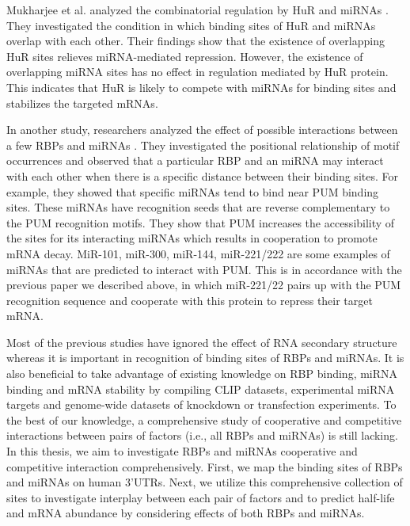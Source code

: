Mukharjee et al. analyzed the combinatorial regulation by HuR and miRNAs \cite{mukharjee_11}. They investigated the condition in which binding sites of HuR and miRNAs overlap with each other. Their findings show that the existence of overlapping HuR sites relieves miRNA-mediated repression. However, the existence of overlapping miRNA sites has no effect in regulation mediated by HuR protein. This indicates that HuR is likely to compete with miRNAs for binding sites and stabilizes the targeted mRNAs.

In another study, researchers analyzed the effect of possible interactions between a few RBPs and miRNAs \cite{jiang_13}. They investigated the positional relationship of motif occurrences and observed that a particular RBP and an miRNA may interact with each other when there is a specific distance between their binding sites. For example, they showed that specific miRNAs tend to bind near PUM binding sites. These miRNAs have recognition seeds that are reverse complementary to the PUM recognition motifs. They show that PUM increases the accessibility of the sites for its interacting miRNAs which results in cooperation to promote mRNA decay. MiR-101, miR-300, miR-144, miR-221/222 are some examples of miRNAs that are predicted to interact with PUM. This is in accordance with the previous paper we described above, in which miR-221/22 pairs up with the PUM recognition sequence and cooperate with this protein to repress their target mRNA. 

Most of the previous studies have ignored the effect of RNA secondary structure whereas it is important in recognition of binding sites of RBPs and miRNAs. It is also beneficial to take advantage of existing knowledge on RBP binding, miRNA binding and mRNA stability by compiling CLIP datasets, experimental miRNA targets and genome-wide datasets of knockdown or transfection experiments. To the best of our knowledge, a comprehensive study of cooperative and competitive interactions between pairs of factors (i.e., all RBPs and miRNAs) is still lacking. In this thesis, we aim to investigate RBPs and miRNAs cooperative and competitive interaction comprehensively. First, we map the binding sites of RBPs and miRNAs on human 3’UTRs. Next, we utilize this comprehensive collection of sites to investigate interplay between each pair of factors and to predict half-life and mRNA abundance by considering effects of both RBPs and miRNAs.

